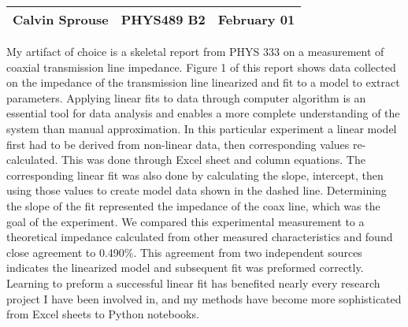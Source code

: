 \documentclass[a4paper, 12pt]{config/homework}
\begin{document}
\noindent
\begin{tabularx}{\textwidth}{>{\centering\arraybackslash}X>{\centering\arraybackslash}X>{\centering\arraybackslash}X}
Calvin Sprouse & PHYS489 B2 & 2024 February 01\\
\midrule
\end{tabularx}



\vspace{\baselineskip}
My artifact of choice is a skeletal report from PHYS 333 on a measurement of coaxial transmission line impedance.
Figure 1 of this report shows data collected on the impedance of the transmission line linearized and fit to a model to extract parameters. Applying linear fits to data through computer algorithm is an essential tool for data analysis and enables a more complete understanding of the system than manual approximation.
In this particular experiment a linear model first had to be derived from non-linear data, then corresponding values re-calculated. This was done through Excel sheet and column equations. The corresponding linear fit was also done by calculating the slope, intercept, then using those values to create model data shown in the dashed line.
Determining the slope of the fit represented the impedance of the coax line, which was the goal of the experiment. We compared this experimental measurement to a theoretical impedance calculated from other measured characteristics and found close agreement to 0.490\%. This agreement from two independent sources indicates the linearized model and subsequent fit was preformed correctly. Learning to preform a successful linear fit has benefited nearly every research project I have been involved in, and my methods have become more sophisticated from Excel sheets to Python notebooks.


\end{document}
